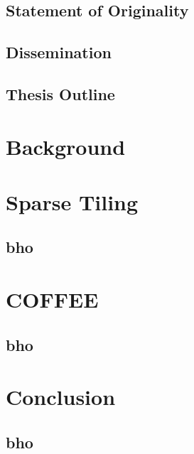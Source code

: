 \section{Statement of Originality}

\section{Dissemination}

\section{Thesis Outline}


\chapter{Background}




\chapter{Sparse Tiling}

\section{bho}


\chapter{COFFEE}

\section{bho}


\chapter{Conclusion}

\section{bho}






